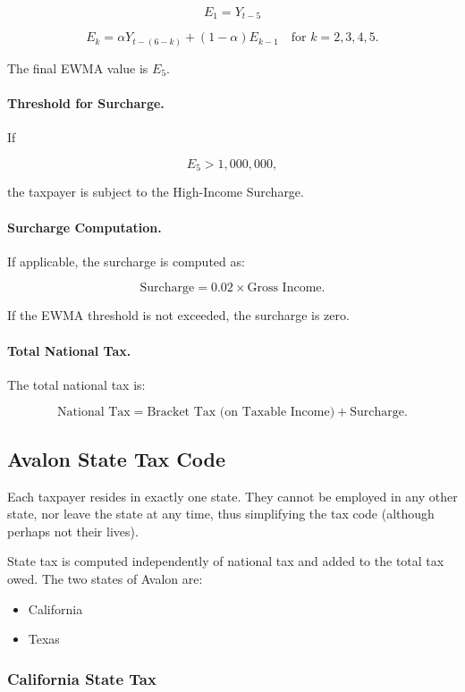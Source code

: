 \[
E_1 = Y_{t-5}
\]

\[
E_k = \alpha Y_{t-(6-k)} + (1 - \alpha) E_{k-1}
\quad \text{for } k = 2,3,4,5.
\]

The final EWMA value is $E_5$.

\paragraph{Threshold for Surcharge.}

If

\[
E_5 > 1{,}000{,}000,
\]

the taxpayer is subject to the High-Income Surcharge.

\paragraph{Surcharge Computation.}

If applicable, the surcharge is computed as:

\[
\text{Surcharge} = 0.02 \times \text{Gross Income}.
\]

If the EWMA threshold is not exceeded, the surcharge is zero.

\paragraph{Total National Tax.}

The total national tax is:

\[
\text{National Tax} =
\text{Bracket Tax (on Taxable Income)} + \text{Surcharge}.
\]

\subsection{Avalon State Tax Code}
\label{appendix:tax-spec:state}

Each taxpayer resides in exactly one state.
They cannot be employed in any other state, nor leave the state at any time, thus simplifying the tax code (although perhaps not their lives).

State tax is computed independently of national tax and added to the total tax owed.
The two states of Avalon are:

\begin{itemize}
  \item California
  \item Texas
\end{itemize}

\subsubsection{California State Tax}

